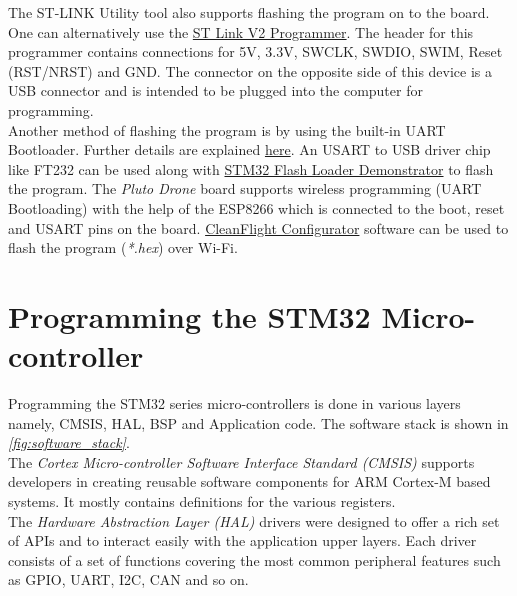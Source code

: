 \documentclass[a4paper,12pt,oneside]{book}
\begin{document}
The ST-LINK Utility tool also supports flashing the program on to the board. One can alternatively use the \href{http://www.amazon.in/xcluma-St-Link-Stlink-Emulator-Downloader/dp/B072TFSGW7/ref=sr_1_1?ie=UTF8&qid=1499104526&sr=8-1&keywords=st+link}{ST Link V2 Programmer}. The header for this programmer contains connections for 5V, 3.3V, SWCLK, SWDIO, SWIM, Reset (RST/NRST) and GND. The connector on the opposite side of this device is a USB connector and is intended to be plugged into the computer for programming.\\

Another method of flashing the program is by using the built-in UART Bootloader. Further details are explained \href{http://www.scienceprog.com/flashing-programs-to-stm32-embedded-bootloader/}{here}. An USART to USB driver chip like FT232 can be used along with \href{http://www.st.com/en/development-tools/flasher-stm32.html}{STM32 Flash Loader Demonstrator} to flash the program. The \textit{Pluto Drone} board supports wireless programming (UART Bootloading) with the help of the ESP8266 which is connected to the boot, reset and USART pins on the board. \href{https://chrome.google.com/webstore/detail/cleanflight-configurator/enacoimjcgeinfnnnpajinjgmkahmfgb?hl=en}{CleanFlight Configurator} software can be used to flash the program (\textit{*.hex}) over Wi-Fi. 

\section{Programming the STM32 Micro-controller}

Programming the STM32 series micro-controllers is done in various layers namely, CMSIS, HAL, BSP and Application code. The software stack is shown in \textit{\autoref{fig:software_stack}}.\\

The \textit{Cortex Micro-controller Software Interface Standard (CMSIS)} supports developers in creating reusable software components for ARM Cortex-M based systems. It mostly contains definitions for the various registers.\\

The \textit{Hardware Abstraction Layer (HAL)} drivers were designed to offer a rich set of APIs and to interact easily with the application upper layers. Each driver consists of a set of functions covering the most common peripheral features such as GPIO, UART, I2C, CAN and so on.\cite{stm32hal}\\
\end{document}
